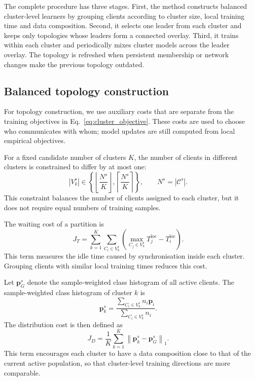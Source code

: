 \documentclass[pdflatex,sn-mathphys-num]{sn-jnl}
\begin{document}
The complete procedure has three stages. First, the method constructs balanced cluster-level learners by grouping clients according to cluster size, local training time and data composition. Second, it selects one leader from each cluster and keeps only topologies whose leaders form a connected overlay. Third, it trains within each cluster and periodically mixes cluster models across the leader overlay. The topology is refreshed when persistent membership or network changes make the previous topology outdated.


\subsection{Balanced topology construction}
\label{subsec:balanced_clustering}

For topology construction, we use auxiliary costs that are separate from the training objectives in Eq.~\eqref{eq:cluster_objective}. These costs are used to choose who communicates with whom; model updates are still computed from local empirical objectives.

For a fixed candidate number of clusters \(K\), the number of clients in different clusters is constrained to differ by at most one:
\begin{equation}
|V_k^s|
\in
\left\{
\left\lfloor
\frac{N^s}{K}
\right\rfloor,
\left\lceil
\frac{N^s}{K}
\right\rceil
\right\},
\qquad
N^s
=
|\mathcal{C}^s|.
\label{eq:cluster_size_constraint}
\end{equation}
This constraint balances the number of clients assigned to each cluster, but it does not require equal numbers of training samples.

The waiting cost of a partition is
\begin{equation}
J_T
=
\sum_{k=1}^{K}
\sum_{C_i\in V_k^s}
\left(
\max_{C_j\in V_k^s}
T_j^{\mathrm{loc}}
-
T_i^{\mathrm{loc}}
\right).
\label{eq:waiting_cost}
\end{equation}
This term measures the idle time caused by synchronisation inside each cluster. Grouping clients with similar local training times reduces this cost.

Let \(\mathbf{p}_G^s\) denote the sample-weighted class histogram of all active clients. The sample-weighted class histogram of cluster \(k\) is
\begin{equation}
\mathbf{p}_k^s
=
\frac{
\sum_{C_i\in V_k^s}
n_i\mathbf{p}_i
}{
\sum_{C_i\in V_k^s}n_i
}.
\label{eq:cluster_histogram}
\end{equation}
The distribution cost is then defined as
\begin{equation}
J_D
=
\frac{1}{K}
\sum_{k=1}^{K}
\left\|
\mathbf{p}_k^s
-
\mathbf{p}_G^s
\right\|_1 .
\label{eq:distribution_cost}
\end{equation}
This term encourages each cluster to have a data composition close to that of the current active population, so that cluster-level training directions are more comparable.
\end{document}
